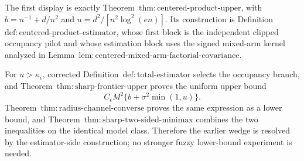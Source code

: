 The first display is exactly Theorem~\(\mathrm{thm:centered\text{-}product\text{-}upper}\), with \(b=n^{-1}+d/n^2\) and \(u=d^2/[n^2\log^2(en)]\).  Its construction is Definition~\(\mathrm{def:centered\text{-}product\text{-}estimator}\), whose first block is the independent clipped occupancy pilot and whose estimation block uses the signed mixed-arm kernel analyzed in Lemma~\(\mathrm{lem:centered\text{-}mixed\text{-}arm\text{-}factorial\text{-}covariance}\).

For \(u>\kappa_{\epsilon}\), corrected Definition~\(\mathrm{def:total\text{-}estimator}\) selects the occupancy branch, and Theorem~\(\mathrm{thm:sharp\text{-}frontier\text{-}upper}\) proves the uniform upper bound
\[
 C_{\epsilon}M^2\{b+\sigma^2\min(1,u)\}.
\]
Theorem~\(\mathrm{thm:radius\text{-}channel\text{-}converse}\) proves the same expression as a lower bound, and Theorem~\(\mathrm{thm:sharp\text{-}two\text{-}sided\text{-}minimax}\) combines the two inequalities on the identical model class.  Therefore the earlier wedge is resolved by the estimator-side construction; no stronger fuzzy lower-bound experiment is needed.